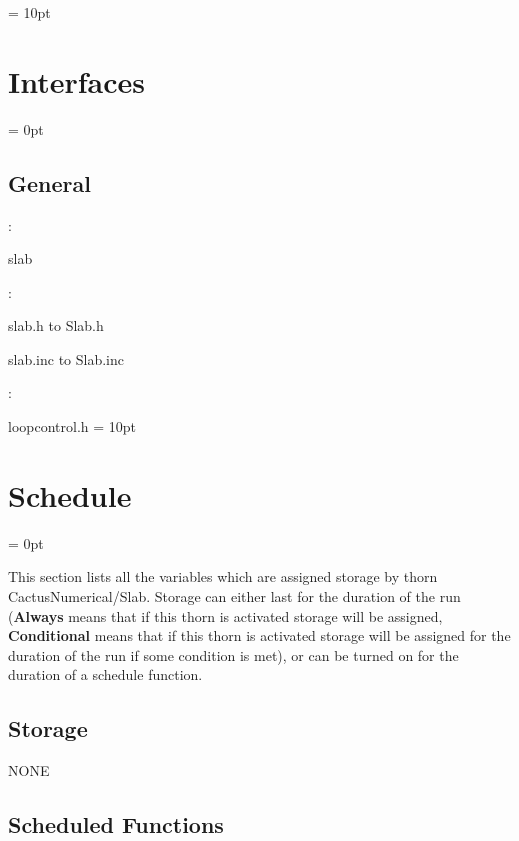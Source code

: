 \vspace{0.5cm}\parskip = 10pt 

\section{Interfaces} 


\parskip = 0pt

\vspace{3mm} \subsection*{General}

: 

slab
\vspace{2mm}

\vspace{5mm}

: 



slab.h to Slab.h

slab.inc to Slab.inc
\vspace{2mm}

: 

loopcontrol.h
\vspace{2mm}\parskip = 10pt 

\section{Schedule} 


\parskip = 0pt


\noindent This section lists all the variables which are assigned storage by thorn CactusNumerical/Slab.  Storage can either last for the duration of the run ({\bf Always} means that if this thorn is activated storage will be assigned, {\bf Conditional} means that if this thorn is activated storage will be assigned for the duration of the run if some condition is met), or can be turned on for the duration of a schedule function.


\subsection*{Storage}NONE
\subsection*{Scheduled Functions}
\vspace{5mm}

